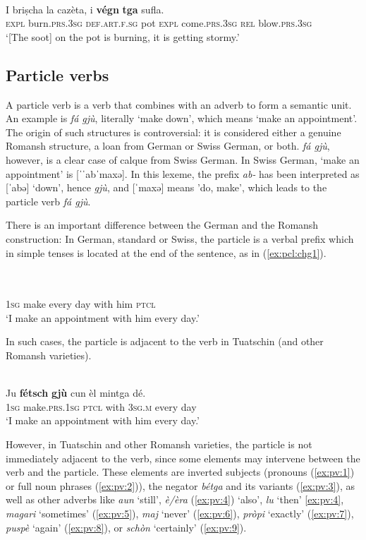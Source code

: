 \ea
\label{ex:vegntga1}
\\
\gll I briṣcha la cazèta, i \textbf{végn} \textbf{tga} sufla. \\
\textsc{expl} burn.\textsc{prs.3sg} \textsc{def.art.f.sg} pot \textsc{expl} come.\textsc{prs.3sg} \textsc{rel} blow.\textsc{prs.3sg} \\
\glt `[The soot] on the pot is burning, it is getting stormy.'
\z


\subsection{Particle verbs}
A particle verb is a verb that combines with an adverb to form a semantic unit. An example is \textit{fá gjù}, literally `make down', which means `make an appointment'. The origin of such structures is controversial: it is considered either a genuine Romansh structure, a loan from German or Swiss German, or both. \textit{fá gjù}, however, is a clear case of calque from Swiss German. In Swiss German, `make an appointment' is [ˈˈabˈmaxə]. In this lexeme, the prefix \textit{ab-} has been interpreted as [ˈabə] `down', hence \textit{gjù}, and [ˈmaxə] means 'do, make', which leads to the particle verb \textit{fá gjù}.

There is an important difference between the German and the Romansh construction: In German, standard or Swiss, the particle is a verbal prefix which in simple tenses is located at the end of the sentence, as in (\ref{ex:pcl:chg1}).

\ea\label{ex:pcl:chg1}
\\
\\
     \textsc{1sg}  make every day with him  \textsc{ptcl} \\
\glt `I make an appointment with him every day.'
\z

In such cases, the particle is adjacent to the verb in Tuatschin (and other Romansh varieties).

\ea\label{}
\\
\gll  Ju \textbf{fétsch} \textbf{gjù} cun èl mintga dé.\\
     \textsc{1sg}  make.\textsc{prs.1sg}  \textsc{ptcl} with \textsc{3sg.m}  every day\\
\glt `I make an appointment with him every day.'
\z

However, in Tuatschin and other Romansh varieties, the particle is not immediately adjacent to the verb, since some elements may intervene between the verb and the particle. These elements are inverted subjects (pronouns (\ref{ex:pv:1}) or full noun phrases (\ref{ex:pv:2})), the negator \textit{bétga} and its variants (\ref{ex:pv:3}), as well as other adverbs like \textit{aun} `still', \textit{è/èra} (\ref{ex:pv:4}) `also', \textit{lu} `then' \ref{ex:pv:4}, \textit{magari} `sometimes' (\ref{ex:pv:5}), \textit{maj} `never' (\ref{ex:pv:6}), \textit{pròpi} `exactly' (\ref{ex:pv:7}), \textit{puspè} `again' (\ref{ex:pv:8}), or \textit{schòn} `certainly' (\ref{ex:pv:9}).

